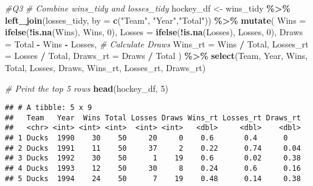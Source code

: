 \documentclass[
]{article}
\newenvironment{Shaded}{\begin{snugshade}}{\end{snugshade}}
\newcommand{\AttributeTok}[1]{\textcolor[rgb]{0.13,0.29,0.53}{#1}}
\newcommand{\CommentTok}[1]{\textcolor[rgb]{0.56,0.35,0.01}{\textit{#1}}}
\newcommand{\DecValTok}[1]{\textcolor[rgb]{0.00,0.00,0.81}{#1}}
\newcommand{\FunctionTok}[1]{\textcolor[rgb]{0.13,0.29,0.53}{\textbf{#1}}}
\newcommand{\NormalTok}[1]{#1}
\newcommand{\OtherTok}[1]{\textcolor[rgb]{0.56,0.35,0.01}{#1}}
\newcommand{\SpecialCharTok}[1]{\textcolor[rgb]{0.81,0.36,0.00}{\textbf{#1}}}
\newcommand{\StringTok}[1]{\textcolor[rgb]{0.31,0.60,0.02}{#1}}
\begin{document}
\begin{Shaded}
\begin{Highlighting}[]
\CommentTok{\#Q3}
\CommentTok{\# Combine wins\_tidy and losses\_tidy}
\NormalTok{hockey\_df }\OtherTok{\textless{}{-}}\NormalTok{ wins\_tidy }\SpecialCharTok{\%\textgreater{}\%}
    \FunctionTok{left\_join}\NormalTok{(losses\_tidy, }\AttributeTok{by =} \FunctionTok{c}\NormalTok{(}\StringTok{"Team"}\NormalTok{, }\StringTok{"Year"}\NormalTok{,}\StringTok{"Total"}\NormalTok{)) }\SpecialCharTok{\%\textgreater{}\%}
    \FunctionTok{mutate}\NormalTok{(}
        \AttributeTok{Wins =} \FunctionTok{ifelse}\NormalTok{(}\SpecialCharTok{!}\FunctionTok{is.na}\NormalTok{(Wins), Wins, }\DecValTok{0}\NormalTok{),}
        \AttributeTok{Losses =} \FunctionTok{ifelse}\NormalTok{(}\SpecialCharTok{!}\FunctionTok{is.na}\NormalTok{(Losses), Losses, }\DecValTok{0}\NormalTok{),}
        \AttributeTok{Draws =}\NormalTok{ Total }\SpecialCharTok{{-}}\NormalTok{ Wins }\SpecialCharTok{{-}}\NormalTok{ Losses,  }\CommentTok{\# Calculate Draws}
        \AttributeTok{Wins\_rt =}\NormalTok{ Wins }\SpecialCharTok{/}\NormalTok{ Total,}
        \AttributeTok{Losses\_rt =}\NormalTok{ Losses }\SpecialCharTok{/}\NormalTok{ Total,}
        \AttributeTok{Draws\_rt =}\NormalTok{ Draws }\SpecialCharTok{/}\NormalTok{ Total}
\NormalTok{    ) }\SpecialCharTok{\%\textgreater{}\%}
    \FunctionTok{select}\NormalTok{(Team, Year, Wins, Total, Losses, Draws, Wins\_rt, Losses\_rt, Draws\_rt)}

\CommentTok{\# Print the top 5 rows}
\FunctionTok{head}\NormalTok{(hockey\_df, }\DecValTok{5}\NormalTok{)}
\end{Highlighting}
\end{Shaded}

\begin{verbatim}
## # A tibble: 5 x 9
##   Team   Year  Wins Total Losses Draws Wins_rt Losses_rt Draws_rt
##   <chr> <int> <int> <int>  <int> <int>   <dbl>     <dbl>    <dbl>
## 1 Ducks  1990    30    50     20     0    0.6       0.4      0   
## 2 Ducks  1991    11    50     37     2    0.22      0.74     0.04
## 3 Ducks  1992    30    50      1    19    0.6       0.02     0.38
## 4 Ducks  1993    12    50     30     8    0.24      0.6      0.16
## 5 Ducks  1994    24    50      7    19    0.48      0.14     0.38
\end{verbatim}
\end{document}
